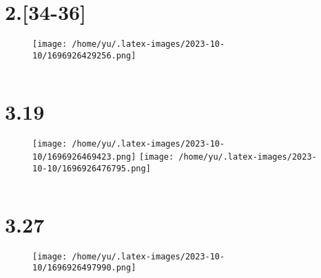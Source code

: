 \documentclass[12pt]{article}
\begin{document}
\vspace*{0pt}
\section*{2.[34-36]}
\begin{figure}[H]
    \centering
    \texttt{[image: /home/yu/.latex-images/2023-10-10/1696926429256.png]}
\end{figure}

\inputminted{cpp}{2.34-36.cpp}


\section*{3.19}
\begin{figure}[H]
    \centering
    \texttt{[image: /home/yu/.latex-images/2023-10-10/1696926469423.png]}
    \texttt{[image: /home/yu/.latex-images/2023-10-10/1696926476795.png]}
\end{figure}

\inputminted{cpp}{3.19.cpp}


\section*{3.27}
\begin{figure}[H]
    \centering
    \texttt{[image: /home/yu/.latex-images/2023-10-10/1696926497990.png]}
\end{figure}

\inputminted{cpp}{3.27.cpp}
\end{document}
